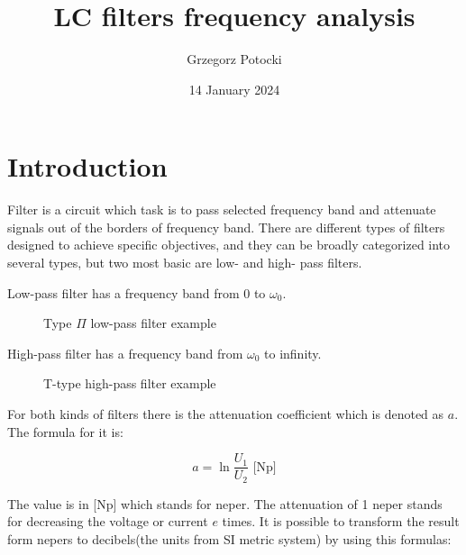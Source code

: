 \documentclass[]{scrartcl}
\title{LC filters frequency analysis}
\author{Grzegorz Potocki}
\date{14 January 2024}
\begin{document}
	


\section{Introduction}

\begin{flushleft}
    Filter is a circuit which task is to pass selected frequency band and attenuate signals out of the borders of frequency band. There are different types of filters designed to achieve specific objectives, and they can be broadly categorized into several types, but two most basic are low- and high- pass filters.    
\end{flushleft}

\begin{flushleft}
    Low-pass filter has a frequency band from 0 to $\omega_0$.
\end{flushleft}

\begin{figure}[H]
	\centering
	
	\caption{Type $\Pi$ low-pass filter example}
	\label{fig:circuitfig_series}
\end{figure}

\begin{flushleft}
    High-pass filter has a frequency band from $\omega_0$ to infinity.
\end{flushleft}

\begin{figure}[H]
	\centering
	
	\caption{T-type high-pass filter example}
	\label{fig:circuitfig_series}
\end{figure}

\begin{flushleft}
    For both kinds of filters there is the attenuation coefficient which is denoted as $a$. The formula for it is:
\end{flushleft}

\begin{equation}
    a=\ln{\frac{U_1}{U_2}} \text{ [Np]}
\end{equation}

\begin{flushleft}
    The value is in [Np] which stands for neper. The attenuation of 1 neper stands for decreasing the voltage or current $e$ times. It is possible to transform the result form nepers to decibels(the units from SI metric system) by using this formulas: 
\end{flushleft}
\end{document}
